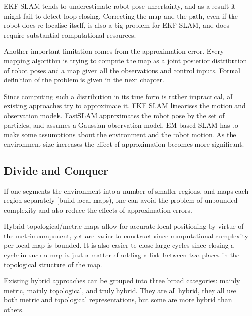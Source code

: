 EKF SLAM tends to underestimate robot pose uncertainty, and as a
result it might fail to detect loop closing. Correcting the map and
the path, even if the robot does re-localise itself, is also a big
problem for EKF SLAM, and does require substantial computational
resources.

Another important limitation comes from the approximation error. Every
mapping algorithm is trying to compute the map as a joint posterior
distribution of robot poses and a map given all the observations and
control inputs. Formal definition of the problem is given in the next
chapter.


Since computing such a distribution in its true form is rather
impractical, all existing approaches try to approximate it. EKF SLAM
linearises the motion and observation models. FastSLAM approximates
the robot pose by the set of particles, and assumes a Gaussian
observation model. EM based SLAM has to make some assumptions about
the environment and the robot motion. As the environment size
increases the effect of approximation becomes more significant.



\subsection{Divide and Conquer} 

If one segments the environment into a number of smaller regions, and
maps each region separately (build local maps), one can avoid the
problem of unbounded complexity and also reduce the effects of
approximation errors.

Hybrid topological/metric maps
\cite{fergusson2003,bosse02atlas,Thrun98a} allow for accurate local
positioning by virtue of the metric component, yet are easier to
construct since computational complexity per local map is bounded. It
is also easier to close large cycles since closing a cycle in such a
map is just a matter of adding a link between two places in the
topological structure of the map.

Existing hybrid approaches can be grouped into three broad
categories: mainly metric, mainly topological, and truly hybrid. They
are all hybrid, they all use both metric and topological
representations, but some are more hybrid than others.


